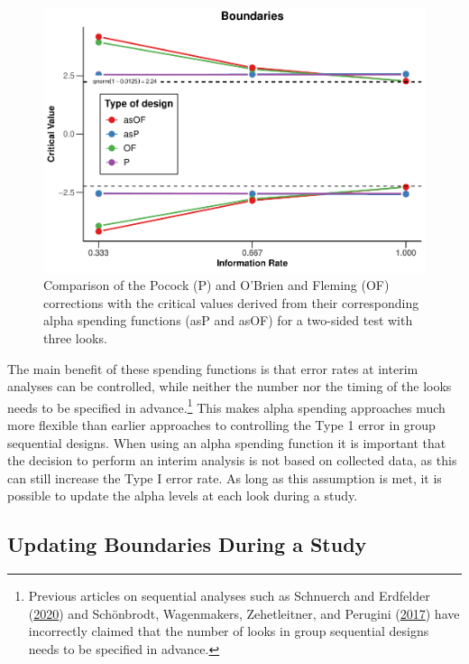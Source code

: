\documentclass[
  english,
  ,man,floatsintext]{apa6}
\begin{document}
\begin{figure}
\centering
\includegraphics{sequential_tutorial_files/figure-latex/spending-comparison-2-1.pdf}
\caption{\label{fig:spending-comparison-2}Comparison of the Pocock (P) and O'Brien and Fleming (OF) corrections with the critical values derived from their corresponding alpha spending functions (asP and asOF) for a two-sided test with three looks.}
\end{figure}

The main benefit of these spending functions is that error rates at interim analyses can be controlled, while neither the number nor the timing of the looks needs to be specified in advance.\footnote{Previous articles on sequential analyses such as Schnuerch and Erdfelder (\protect\hyperlink{ref-schnuerch_controlling_2020}{2020}) and Schönbrodt, Wagenmakers, Zehetleitner, and Perugini (\protect\hyperlink{ref-schonbrodt_sequential_2017}{2017}) have incorrectly claimed that the number of looks in group sequential designs needs to be specified in advance.} This makes alpha spending approaches much more flexible than earlier approaches to controlling the Type 1 error in group sequential designs. When using an alpha spending function it is important that the decision to perform an interim analysis is not based on collected data, as this can still increase the Type I error rate. As long as this assumption is met, it is possible to update the alpha levels at each look during a study.

\hypertarget{updating-boundaries-during-a-study}{%
\subsection{Updating Boundaries During a Study}\label{updating-boundaries-during-a-study}}
\end{document}
